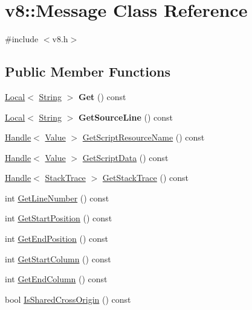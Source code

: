 \hypertarget{classv8_1_1_message}{}\section{v8\+:\+:Message Class Reference}
\label{classv8_1_1_message}


{\ttfamily \#include $<$v8.\+h$>$}

\subsection*{Public Member Functions}
\begin{DoxyCompactItemize}
\item 
\hypertarget{classv8_1_1_message_a72f26c7b684bbfbd14d5970849fdf3d2}{}\hyperlink{classv8_1_1_local}{Local}$<$ \hyperlink{classv8_1_1_string}{String} $>$ {\bfseries Get} () const \label{classv8_1_1_message_a72f26c7b684bbfbd14d5970849fdf3d2}

\item 
\hypertarget{classv8_1_1_message_a0d5cceb5128a147818c72b82950e475d}{}\hyperlink{classv8_1_1_local}{Local}$<$ \hyperlink{classv8_1_1_string}{String} $>$ {\bfseries Get\+Source\+Line} () const \label{classv8_1_1_message_a0d5cceb5128a147818c72b82950e475d}

\item 
\hyperlink{classv8_1_1_handle}{Handle}$<$ \hyperlink{classv8_1_1_value}{Value} $>$ \hyperlink{classv8_1_1_message_ac5d31afb758897cd1653c5eb3327a4d6}{Get\+Script\+Resource\+Name} () const 
\item 
\hyperlink{classv8_1_1_handle}{Handle}$<$ \hyperlink{classv8_1_1_value}{Value} $>$ \hyperlink{classv8_1_1_message_ace10c210ccbb542b1b75cadefbc4e899}{Get\+Script\+Data} () const 
\item 
\hyperlink{classv8_1_1_handle}{Handle}$<$ \hyperlink{classv8_1_1_stack_trace}{Stack\+Trace} $>$ \hyperlink{classv8_1_1_message_adeffa297a5a28955dd16c084632aa645}{Get\+Stack\+Trace} () const 
\item 
int \hyperlink{classv8_1_1_message_a67f97fd76b8f98ed65743b9615d64a79}{Get\+Line\+Number} () const 
\item 
int \hyperlink{classv8_1_1_message_a31a550a1d3d09a2d72d0742be821956f}{Get\+Start\+Position} () const 
\item 
int \hyperlink{classv8_1_1_message_a50cbec87379e628b1647466926882037}{Get\+End\+Position} () const 
\item 
int \hyperlink{classv8_1_1_message_aab8007ba81d3f195280bce0693810cc2}{Get\+Start\+Column} () const 
\item 
int \hyperlink{classv8_1_1_message_aaf82cd7f7449add5f50d4253499cad05}{Get\+End\+Column} () const 
\item 
bool \hyperlink{classv8_1_1_message_a03228f50c40c45da52f424bdd64598d1}{Is\+Shared\+Cross\+Origin} () const 
\end{DoxyCompactItemize}
